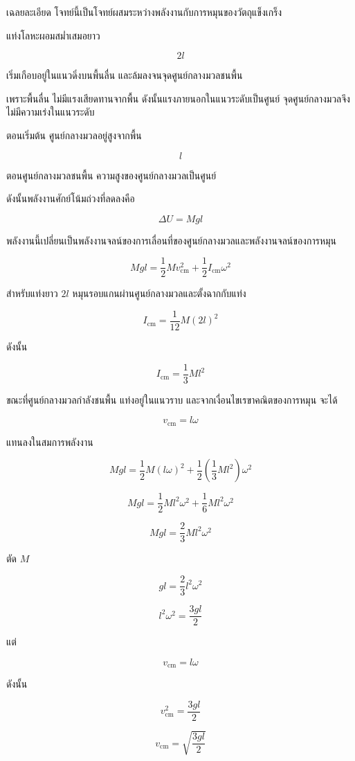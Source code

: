 \begin{examplebox}{เฉลยละเอียด}
โจทย์นี้เป็นโจทย์ผสมระหว่างพลังงานกับการหมุนของวัตถุแข็งเกร็ง

แท่งโลหะผอมสม่ำเสมอยาว

\[
2l
\]

เริ่มเกือบอยู่ในแนวดิ่งบนพื้นลื่น และล้มลงจนจุดศูนย์กลางมวลชนพื้น

เพราะพื้นลื่น ไม่มีแรงเสียดทานจากพื้น ดังนั้นแรงภายนอกในแนวระดับเป็นศูนย์ จุดศูนย์กลางมวลจึงไม่มีความเร่งในแนวระดับ

ตอนเริ่มต้น ศูนย์กลางมวลอยู่สูงจากพื้น

\[
l
\]

ตอนศูนย์กลางมวลชนพื้น ความสูงของศูนย์กลางมวลเป็นศูนย์

ดังนั้นพลังงานศักย์โน้มถ่วงที่ลดลงคือ

\[
\Delta U=Mgl
\]

พลังงานนี้เปลี่ยนเป็นพลังงานจลน์ของการเลื่อนที่ของศูนย์กลางมวลและพลังงานจลน์ของการหมุน

\[
Mgl=\frac{1}{2}Mv_{\text{cm}}^2+\frac{1}{2}I_{\text{cm}}\omega^2
\]

สำหรับแท่งยาว \(2l\) หมุนรอบแกนผ่านศูนย์กลางมวลและตั้งฉากกับแท่ง

\[
I_{\text{cm}}=\frac{1}{12}M(2l)^2
\]

ดังนั้น

\[
I_{\text{cm}}=\frac{1}{3}Ml^2
\]

ขณะที่ศูนย์กลางมวลกำลังชนพื้น แท่งอยู่ในแนวราบ และจากเงื่อนไขเรขาคณิตของการหมุน จะได้

\[
v_{\text{cm}}=l\omega
\]

แทนลงในสมการพลังงาน

\[
Mgl=\frac{1}{2}M(l\omega)^2+\frac{1}{2}\left(\frac{1}{3}Ml^2\right)\omega^2
\]

\[
Mgl=\frac{1}{2}Ml^2\omega^2+\frac{1}{6}Ml^2\omega^2
\]

\[
Mgl=\frac{2}{3}Ml^2\omega^2
\]

ตัด \(M\)

\[
gl=\frac{2}{3}l^2\omega^2
\]

\[
l^2\omega^2=\frac{3gl}{2}
\]

แต่

\[
v_{\text{cm}}=l\omega
\]

ดังนั้น

\[
v_{\text{cm}}^2=\frac{3gl}{2}
\]

\[
\boxed{v_{\text{cm}}=\sqrt{\frac{3gl}{2}}}
\]
\end{examplebox}

